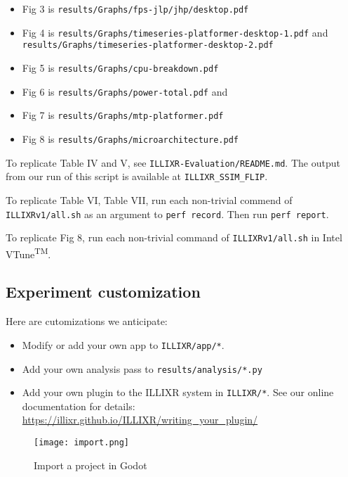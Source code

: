 \documentclass{sigplanconf}
\begin{document}
\begin{itemize}
\item Fig 3 is {\footnotesize\texttt{results/Graphs/fps-jlp/jhp/desktop.pdf}}
\item Fig 4 is {\footnotesize\texttt{results/Graphs/timeseries-platformer-desktop-1.pdf}} and {\footnotesize\texttt{results/Graphs/timeseries-platformer-desktop-2.pdf}}
\item Fig 5 is {\footnotesize\texttt{results/Graphs/cpu-breakdown.pdf}}
\item Fig 6 is {\footnotesize\texttt{results/Graphs/power-total.pdf}} and
\item Fig 7 is {\footnotesize\texttt{results/Graphs/mtp-platformer.pdf}}
\item Fig 8 is {\footnotesize\texttt{results/Graphs/microarchitecture.pdf}}
\end{itemize}

To replicate Table IV and V, see \texttt{ILLIXR-Evaluation/README.md}. The output from our run of this script is available at \texttt{ILLIXR\_SSIM\_FLIP}.

To replicate Table VI, Table VII, run each non-trivial commend of \texttt{ILLIXRv1/all.sh} as an argument to \texttt{perf record}. Then run \texttt{perf report}.

To replicate Fig 8, run each non-trivial command of \texttt{ILLIXRv1/all.sh} in Intel\textsuperscript{\textcopyright} VTune\textsuperscript{TM}.

\subsection{Experiment customization}

Here are cutomizations we anticipate:

\begin{itemize}
\item Modify or add your own app to \texttt{ILLIXR/app/*}.
\item Add your own analysis pass to \texttt{results/analysis/*.py}
\item Add your own plugin to the ILLIXR system in \texttt{ILLIXR/*}. See our online documentation for details:\newline
{\footnotesize \url{https://illixr.github.io/ILLIXR/writing_your_plugin/}}
\end{itemize}

\begin{figure}[h]
  \caption{Import a project in Godot}
  \texttt{[image: import.png]}
\end{figure}
\end{document}
